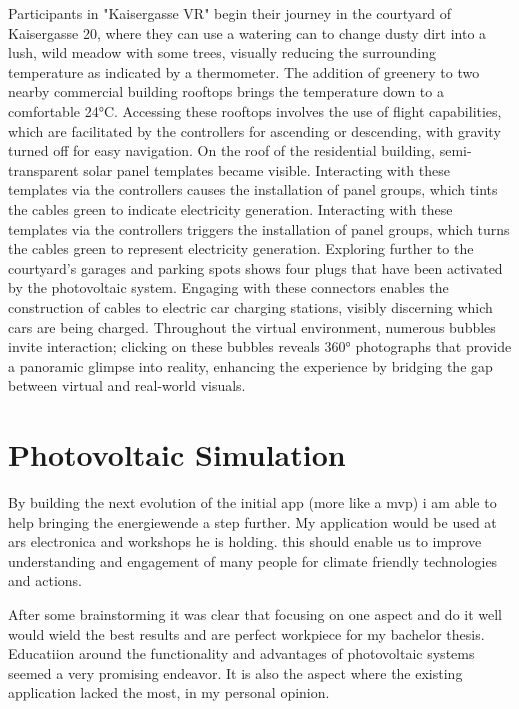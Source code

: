 \documentclass[draft, final]{vutinfth} %
\begin{document}
Participants in "Kaisergasse VR" begin their journey in the courtyard of Kaisergasse 20, where they can use a watering can to change dusty dirt into a lush, wild meadow with some trees, visually reducing the surrounding temperature as indicated by a thermometer. The addition of greenery to two nearby commercial building rooftops brings the temperature down to a comfortable 24°C. Accessing these rooftops involves the use of flight capabilities, which are facilitated by the controllers for ascending or descending, with gravity turned off for easy navigation. On the roof of the residential building, semi-transparent solar panel templates became visible. Interacting with these templates via the controllers causes the installation of panel groups, which tints the cables green to indicate electricity generation.
Interacting with these templates via the controllers triggers the installation of panel groups, which turns the cables green to represent electricity generation. Exploring further to the courtyard's garages and parking spots shows four plugs that have been activated by the photovoltaic system. Engaging with these connectors enables the construction of cables to electric car charging stations, visibly discerning which cars are being charged.
Throughout the virtual environment, numerous bubbles invite interaction; clicking on these bubbles reveals 360° photographs that provide a panoramic glimpse into reality, enhancing the experience by bridging the gap between virtual and real-world visuals.

\section{Photovoltaic Simulation}
By building the next evolution of the initial app (more like a mvp) i am able to help bringing the energiewende a step further. My application would  be used at ars electronica and workshops he is holding. this should enable us to improve understanding and engagement of many people for climate friendly technologies and actions. 

After some brainstorming it was clear that focusing on one aspect and do it well would wield the best results and are perfect workpiece for my bachelor thesis. Educatiion around the functionality and advantages of photovoltaic systems seemed a very promising endeavor. It is also the aspect where the existing application lacked the most, in my personal opinion.

\end{document}
